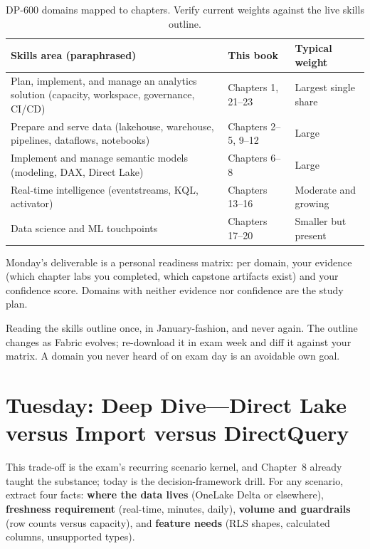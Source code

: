 \begin{table}[H]
\centering
\small
\begin{tabular}{@{}p{5.8cm}p{4.2cm}p{3.6cm}@{}}
\toprule
\textbf{Skills area (paraphrased)} & \textbf{This book} & \textbf{Typical weight} \\
\midrule
Plan, implement, and manage an analytics solution (capacity, workspace, governance, CI/CD) & Chapters 1, 21--23 & Largest single share \\
Prepare and serve data (lakehouse, warehouse, pipelines, dataflows, notebooks) & Chapters 2--5, 9--12 & Large \\
Implement and manage semantic models (modeling, DAX, Direct Lake) & Chapters 6--8 & Large \\
Real-time intelligence (eventstreams, KQL, activator) & Chapters 13--16 & Moderate and growing \\
Data science and ML touchpoints & Chapters 17--20 & Smaller but present \\
\bottomrule
\end{tabular}
\caption{DP-600 domains mapped to chapters. Verify current weights against the live skills outline.}
\label{tab:chapter24-domains}
\end{table}

Monday's deliverable is a personal readiness matrix: per domain, your evidence (which chapter labs you completed, which capstone artifacts exist) and your confidence score. Domains with neither evidence nor confidence are the study plan.

\begin{pitfall}
Reading the skills outline once, in January-fashion, and never again. The outline changes as Fabric evolves; re-download it in exam week and diff it against your matrix. A domain you never heard of on exam day is an avoidable own goal.
\end{pitfall}

\section{Tuesday: Deep Dive---Direct Lake versus Import versus DirectQuery}
This trade-off is the exam's recurring scenario kernel, and Chapter~8 already taught the substance; today is the decision-framework drill. For any scenario, extract four facts: \textbf{where the data lives} (OneLake Delta or elsewhere), \textbf{freshness requirement} (real-time, minutes, daily), \textbf{volume and guardrails} (row counts versus capacity), and \textbf{feature needs} (RLS shapes, calculated columns, unsupported types).

